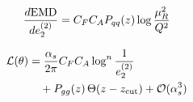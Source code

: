 \begin{equation}
  \frac{d \mathrm{EMD}}{d e_2^{(2)}} = C_F C_A P_{qq}(z) \log\frac{\mu_R^2}{Q^2}
  \label{eq:7}
\end{equation}

\begin{align}
  \mathcal{L}(\theta) &= \frac{\alpha_s}{2\pi} C_F C_A \log^{n} \frac{1}{e_2^{(2)}} \nonumber \\
  &\quad + P_{gg}(z) \, \Theta(z - z_{\rm cut}) + \mathcal{O}(\alpha_s^3) \label{eq:9}
\end{align}

